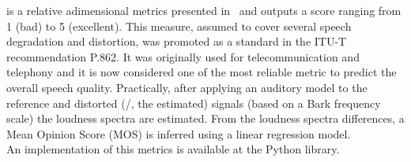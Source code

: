  is a relative adimensional metrics presented in~ and outputs a score ranging from 1 (bad) to 5 (excellent).
This measure, assumed to cover several speech degradation and distortion, was promoted as a standard in the ITU-T recommendation P.862.
It was originally used for telecommunication and telephony and it is now considered one of the most reliable metric to predict the overall speech quality.
Practically, after applying an auditory model to the reference and distorted (\ie/, the estimated) signals (based on a Bark frequency scale) the loudness spectra are estimated.
From the loudness spectra differences, a Mean Opinion Score (MOS) is inferred using a linear regression model.
\\An implementation of this metrics is available at the \href{https://github.com/aliutkus/speechmetrics/}{} Python library.


